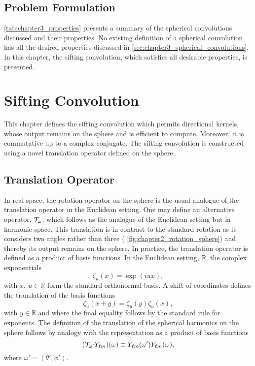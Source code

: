 \subsection{Problem Formulation}

\cref{tab:chapter3_properties} presents a summary of the spherical convolutions discussed and their properties.
No existing definition of a spherical convolution has all the desired properties discussed in \cref{sec:chapter3_spherical_convolutions}.
In this chapter, the sifting convolution, which satisfies all desirable properties, is presented.



\section{Sifting Convolution}\label{sec:chapter3_sifting_convolution}

This chapter defines the sifting convolution which permits directional kernels, whose output remains on the sphere and is efficient to compute.
Moreover, it is commutative up to a complex conjugate.
The sifting convolution is constructed using a novel translation operator defined on the sphere.

\subsection{Translation Operator}\label{sec:chapter3_translation_operator}

In real space, the rotation operator on the sphere is the usual analogue of the translation operator in the Euclidean setting.
One may define an alternative operator, \(\translation{\omega}\), which follows as the analogue of the Euclidean setting but in harmonic space.
This translation is in contrast to the standard rotation as it considers two angles rather than three (\cf{} \cref{fig:chapter2_rotation_sphere}) and thereby its output remains on the sphere.
In practice, the translation operator is defined as a product of basis functions.
In the Euclidean setting, \eg{} \(\mathbb{R}\), the complex exponentials
%
\begin{equation}\label{eq:chapter3_complex_exponentials}
    \zeta_{u}(x)
    = \exp(i u x),
\end{equation}
%
with \(x,\ u \in \mathbb{R}\) form the standard orthonormal basis.
A shift of coordinates defines the translation of the basis functions
%
\begin{equation}\label{eq:chapter3_exponentials_shift}
    \zeta_{u}(x + y)
    = \zeta_{u}(y) \zeta_{u}(x),
\end{equation}
%
with \(y \in \mathbb{R}\) and where the final equality follows by the standard rule for exponents.
The definition of the translation of the spherical harmonics on the sphere follows by analogy with the representation as a product of basis functions
%
\begin{equation}\label{eq:chapter3_translation_basis_functions}
    \pixel{(\translation{\omega'}\harmonic{Y})}
    \equiv \pixel[']{\harmonic{Y}} \pixel{\harmonic{Y}},
\end{equation}
%
where \(\omega'=(\theta',\phi')\).

